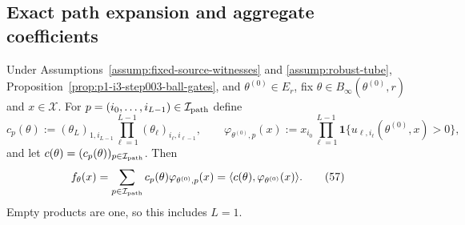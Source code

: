 \subsection{Exact path expansion and aggregate coefficients}
\label{app:step004-paths}

\begin{lemma}
\label{lem:p1-i3-step004-path-expansion}
Under Assumptions~\ref{assump:fixed-source-witnesses} and
\ref{assump:robust-tube}, Proposition~\ref{prop:p1-i3-step003-ball-gates},
and $\theta^{(0)}\in E_r$, fix
$\theta\in B_\infty(\theta^{(0)},r)$ and $x\in\mathcal X$.  For
$p=(i_0,\ldots,i_{L-1})\in\mathcal I_{\rm path}$ define
\[
c_p(\theta):=(\theta_L)_{1,i_{L-1}}
\prod_{\ell=1}^{L-1}(\theta_\ell)_{i_\ell,i_{\ell-1}},
\qquad
\varphi_{\theta^{(0)},p}(x):=x_{i_0}
\prod_{\ell=1}^{L-1}
\mathbf1\{u_{\ell,i_\ell}(\theta^{(0)},x)>0\},
\tag{56}\label{eq:p1-i3-eq056}
\]
and let $c(\theta)=(c_p(\theta))_{p\in\mathcal I_{\rm path}}$.  Then
\[
f_\theta(x)=\sum_{p\in\mathcal I_{\rm path}}c_p(\theta)
\varphi_{\theta^{(0)},p}(x)
=\langle c(\theta),\varphi_{\theta^{(0)}}(x)\rangle.
\tag{57}\label{eq:p1-i3-eq057}
\]
Empty products are one, so this includes $L=1$.
\end{lemma}

